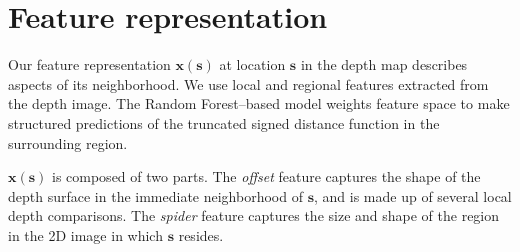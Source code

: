\documentclass[10pt,twocolumn,letterpaper]{article}
\newcommand{\feat}{\mathbf{x}}
\newcommand{\pixelidx}{\mathbf{s}}
\newcommand{\note}[1]{\textcolor{blue}{NOTE: #1}}
\begin{document}
\section{Feature representation}
\label{sec:features}

\newcommand{\scalfeat}{x}

Our feature representation $\feat(\pixelidx)$ at location $\pixelidx$ in the depth map describes aspects of its neighborhood.
We use local and regional features extracted from the depth image.
The Random Forest--based model weights feature space to make structured predictions of the truncated signed distance function in the surrounding region.

$\feat(\pixelidx)$ is composed of two parts.
The \emph{offset} feature captures the shape of the depth surface in the immediate neighborhood of $\pixelidx$, and is made up of several local depth comparisons.
The \emph{spider} feature captures the size and shape of the region in the 2D image in which $\pixelidx$ resides.

\end{document}
